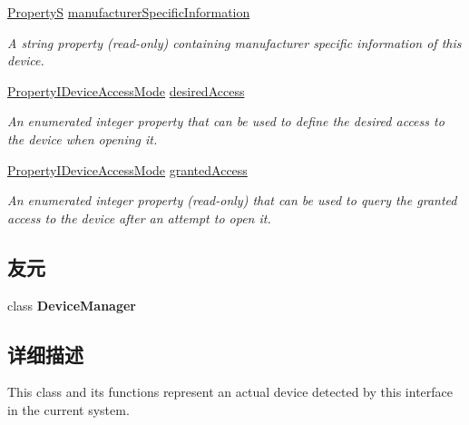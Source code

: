 \begin{DoxyCompactItemize}
\hyperlink{classmv_i_m_p_a_c_t_1_1acquire_1_1_property_s}{Property\+S} \hyperlink{classmv_i_m_p_a_c_t_1_1acquire_1_1_device_ad10fa0ebc71bae2bf872fcbed6d34701}{manufacturer\+Specific\+Information}
\begin{DoxyCompactList}\small\item\em A string property {\bfseries }(read-\/only) containing manufacturer specific information of this device. \end{DoxyCompactList}\item 
\hyperlink{group___common_interface_gac860ed08eaeb7ccb3cbc879a22ca43c9}{Property\+I\+Device\+Access\+Mode} \hyperlink{classmv_i_m_p_a_c_t_1_1acquire_1_1_device_a26e3ec1dd3b45767268946aebfbc3250}{desired\+Access}
\begin{DoxyCompactList}\small\item\em An enumerated integer property that can be used to define the desired access to the device when opening it. \end{DoxyCompactList}\item 
\hyperlink{group___common_interface_gac860ed08eaeb7ccb3cbc879a22ca43c9}{Property\+I\+Device\+Access\+Mode} \hyperlink{classmv_i_m_p_a_c_t_1_1acquire_1_1_device_a1bafdfce12e0ea8b8f9fa0c3c36ab4bb}{granted\+Access}
\begin{DoxyCompactList}\small\item\em An enumerated integer property {\bfseries }(read-\/only) that can be used to query the granted access to the device after an attempt to open it. \end{DoxyCompactList}\end{DoxyCompactItemize}
\subsection*{友元}
\begin{DoxyCompactItemize}
\item 
\hypertarget{classmv_i_m_p_a_c_t_1_1acquire_1_1_device_aead9a9546ea765538d3f95894afea912}{class {\bfseries Device\+Manager}}\label{classmv_i_m_p_a_c_t_1_1acquire_1_1_device_aead9a9546ea765538d3f95894afea912}

\end{DoxyCompactItemize}


\subsection{详细描述}
This class and its functions represent an actual device detected by this interface in the current system. 

